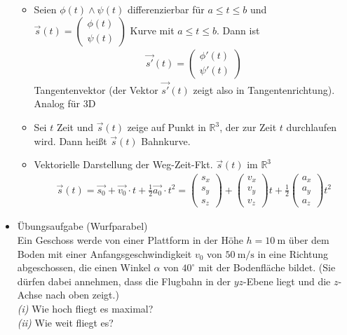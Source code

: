 \documentclass[a4paper, 12pt, onecolumn]{scrartcl}
\begin{document}
\begin{itemize}
\begin{itemize}
    \item Seien $\phi (t) \wedge \psi (t)$ differenzierbar für $a \le t \le b$
    und $\vec{s} (t) = \left( \begin{matrix} \phi (t) \\ \psi (t) \end{matrix} \right)$
    Kurve mit $a \le t \le b$. Dann ist \\
      \begin{align}
        \vec{s'} (t) = \begin{pmatrix} \phi' (t) \\ \psi' (t) \end{pmatrix}
      \end{align}
    Tangentenvektor (der Vektor $\vec{s'} (t)$ zeigt also in Tangentenrichtung). \\
    Analog für 3D
    
    \item Sei $t$ Zeit und $\vec{s} (t)$ zeige auf Punkt in $\mathbb{R}^3$, der zur Zeit $t$
    durchlaufen wird. Dann heißt $\vec{s} (t)$ Bahnkurve.
    
    \item  Vektorielle Darstellung der Weg-Zeit-Fkt. $\vec{s} (t)$ im $\mathbb{R}^3$
    \begin{align}
    \vec{s} (t) = \vec{s_0} + \vec{v_0} \cdot t + \frac{1}{2} \vec{a_0} \cdot t^2 =
           \begin{pmatrix} s_x \\ s_y \\ s_z \end{pmatrix} + \begin{pmatrix} v_x \\ v_y \\ v_z \end{pmatrix} t + 
           \frac{1}{2} \begin{pmatrix} a_x \\ a_y \\ a_z \end{pmatrix} t^2
    \end{align}
    \end{itemize}

  \item Übungsaufgabe (Wurfparabel)\\
    Ein Geschoss werde von einer Plattform in der Höhe $h = \SI{10}{\meter}$ über dem Boden mit einer Anfangsgeschwindigkeit 
    $v_0$ von $\SI{50}{\meter\per\second}$ in eine Richtung abgeschossen, die einen Winkel $\alpha$ von $40^{\circ}$
    mit der Bodenfläche bildet. 
    (Sie dürfen dabei annehmen, dass die Flugbahn in der $yz$-Ebene liegt und die $z$-Achse nach oben zeigt.)\\
    \emph{(i)} Wie hoch fliegt es maximal? \\
    \emph{(ii)} Wie weit fliegt es?
    

\end{itemize}
\end{document}
